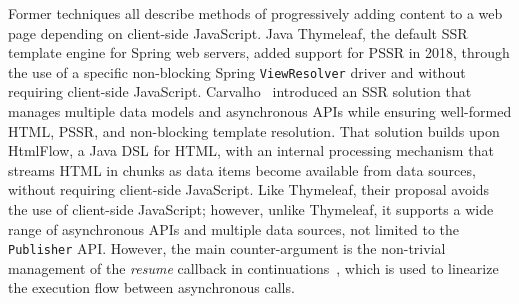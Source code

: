 Former techniques all describe methods of progressively adding content to a web
page depending on client-side JavaScript.
Java Thymeleaf, the default SSR template engine for Spring web servers,
added support for PSSR in 2018, through the use of a specific non-blocking
Spring \texttt{ViewResolver} driver and without requiring client-side
JavaScript.
Carvalho~\cite{carvalho2023async} introduced an SSR solution that manages
multiple data models and asynchronous APIs while ensuring well-formed HTML,
PSSR, and non-blocking template resolution. That solution builds upon HtmlFlow,
a Java DSL for HTML, with an internal processing mechanism that streams HTML in
chunks as data items become available from data sources, without requiring
client-side JavaScript. Like Thymeleaf, their proposal avoids the use of
client-side JavaScript; however, unlike Thymeleaf, it supports a wide range of
asynchronous APIs and multiple data sources, not limited to the
\texttt{Publisher} API. However, the main counter-argument is the non-trivial
management of the \emph{resume} callback in
continuations~\cite{von2003events,callbackhell}, which is used to linearize the
execution flow between asynchronous calls.